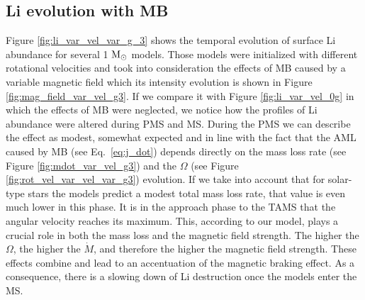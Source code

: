 \documentclass[fleqn,usenatbib]{mnras}
\begin{document}
\begin{ceqn}
\subsection{Li evolution with MB}
Figure \ref{fig:li_var_vel_var_g_3} shows the temporal evolution of surface Li abundance for several 1 $\mathrm{M}_\odot$ models. Those models were initialized with different rotational velocities and took into consideration the effects of MB caused by a variable magnetic field which its intensity evolution is shown in Figure \ref{fig:mag_field_var_vel_g3}. If we compare it with Figure \ref{fig:li_var_vel_0g} in which the effects of MB were neglected, we notice how the profiles of Li abundance were altered during PMS and MS. During the PMS we can describe the effect as modest, somewhat expected and in line with the fact that the AML caused by MB (see Eq.~\ref{eq:j_dot}) depends directly on the mass loss rate (see Figure \ref{fig:mdot_var_vel_g3}) and the $\Omega$ (see Figure \ref{fig:rot_vel_var_vel_var_g3}) evolution. If we take into account that for solar-type stars the models predict a modest total mass loss rate, that value is even much lower in this phase. It is in the approach phase to the TAMS that the angular velocity reaches its maximum. This, according to our model, plays a crucial role in both the mass loss and the magnetic field strength. The higher the $\Omega$, the higher the $\Dot{M}$, and therefore the higher the magnetic field strength. These effects combine and lead to an accentuation of the magnetic braking effect. As a consequence, there is a slowing down of Li destruction once the models enter the MS.\par



\end{ceqn}
\end{document}
